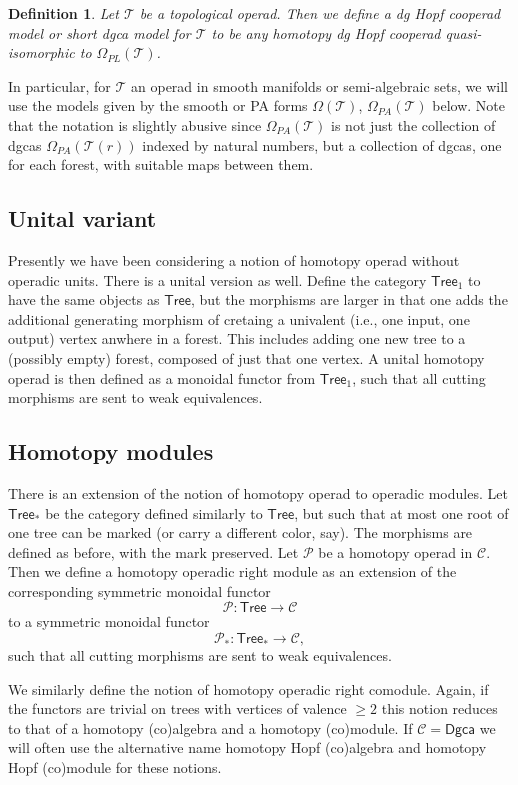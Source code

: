\documentclass[a4paper]{amsart}
\theoremstyle{plain}
\newtheorem{defi}[thm]{Definition}
\theoremstyle{definition}
\newcommand{\op}{\mathcal}
\newcommand{\dgca}{\mathsf{Dgca}}
\newcommand{\mC}{{\mathcal{C}}}
\newcommand{\Tree}{{\mathsf{Tree}}}
\begin{document}
\begin{defi}
 Let $\op T$ be a topological operad. Then we define a \emph{dg Hopf cooperad model} or short \emph{dgca model} for $\op T$ to be any homotopy dg Hopf cooperad quasi-isomorphic to $\Omega_{PL}(\op T)$.
\end{defi}
In particular, for $\op T$ an operad in smooth manifolds or semi-algebraic sets, we will use the models given by the smooth or PA forms $\Omega(\op T)$, $\Omega_{PA}(\op T)$ below.
Note that the notation is slightly abusive since $\Omega_{PA}(\op T)$ is not just the collection of dgcas $\Omega_{PA}(\op T(r))$ indexed by natural numbers, but a collection of dgcas, one for each forest, with suitable maps between them.



\subsection{Unital variant}
Presently we have been considering a notion of homotopy operad without operadic units.
There is a unital version as well. Define the category $\Tree_1$ to have the same objects as $\Tree$, but the morphisms are larger in that one adds the additional generating morphism of cretaing a univalent (i.e., one input, one output) vertex anwhere in a forest. This includes adding one new tree to a (possibly empty) forest, composed of just that one vertex.
A unital homotopy operad is then defined as a monoidal functor from $\Tree_1$, such that all cutting morphisms are sent to weak equivalences.



\subsection{Homotopy modules}
There is an extension of the notion of homotopy operad to operadic modules.
Let $\Tree_*$ be the category defined similarly to $\Tree$, but such that at most one root of one tree can be marked (or carry a different color, say).
The morphisms are defined as before, with the mark preserved.
Let $\op P$ be a homotopy operad in $\mC$. Then we define a homotopy operadic right module as an extension of the corresponding symmetric monoidal functor 
\[
 \op P: \Tree \to \mC
\]
to a symmetric monoidal functor 
\[
 \op P_*: \Tree_* \to \mC,
\]
such that all cutting morphisms are sent to weak equivalences.

We similarly define the notion of homotopy operadic right comodule.
Again, if the functors are trivial on trees with vertices of valence $\geq 2$ this notion reduces to that of a homotopy (co)algebra and a homotopy (co)module.
If $\mC=\dgca$ we will often use the alternative name homotopy Hopf (co)algebra and homotopy Hopf (co)module for these notions.
\end{document}
